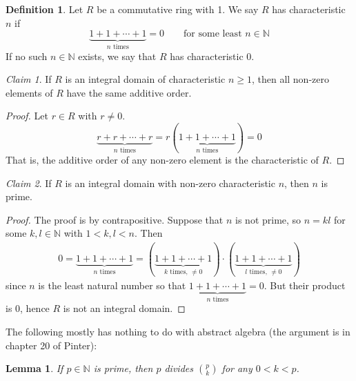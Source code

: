 \documentclass[12pt,letterpaper,DIV=11,final]{scrartcl}
\theoremstyle{plain}
\newtheorem{lemma}[theorem]{Lemma}
\theoremstyle{definition}
\newtheorem{definition}{Definition}[section]
\theoremstyle{remark}
\newtheorem{claim}{Claim}
\begin{document}
\begin{definition}
  Let $R$ be a commutative ring with 1.
  We say $R$ has characteristic $n$ if
  \begin{displaymath}
    \underbrace{1 + 1 + \cdots + 1}_\text{$n$ times} = 0 \qquad\text{for some least $n \in \mathbb{N}$}
  \end{displaymath}
  If no such $n \in \mathbb{N}$ exists, we say that $R$ has characteristic 0.
\end{definition}

\begin{claim}
  If $R$ is an integral domain of characteristic $n \geq 1$, then all non-zero elements of $R$ have the same additive order.

  \begin{proof}
    Let $r \in R$ with $r \neq 0$.
    \begin{displaymath}
      \underbrace{r + r + \cdots + r}_\text{$n$ times} = r (\underbrace{1 + 1 + \cdots + 1}_\text{$n$ times}) = 0
    \end{displaymath}
    That is, the additive order of any non-zero element is the characteristic of $R$.
  \end{proof}
\end{claim}

\begin{claim}
  If $R$ is an integral domain with non-zero characteristic $n$, then $n$ is prime.

  \begin{proof}
    The proof is by contrapositive.
    Suppose that $n$ is not prime, so $n = kl$ for some $k, l \in \mathbb{N}$ with $1 < k, l < n$.
    Then
    \begin{align*}
      0 = \underbrace{1 + 1 + \cdots + 1}_\text{$n$ times} = (\underbrace{1 + 1 + \cdots + 1}_\text{$k$ times, $\neq 0$}) \cdot (\underbrace{1 + 1 + \cdots + 1}_\text{$l$ times, $\neq 0$})
    \end{align*}
    since $n$ is the least natural number so that $\underbrace{1 + 1 + \cdots + 1}_\text{$n$ times} = 0$.
    But their product is 0, hence $R$ is not an integral domain.
  \end{proof}
\end{claim}

The following mostly has nothing to do with abstract algebra (the argument is in chapter 20 of Pinter):
\begin{lemma}
  If $p \in \mathbb{N}$ is prime, then $p$ divides $\binom{p}{k}$ for any $0 < k < p$.
\end{lemma}
\end{document}
